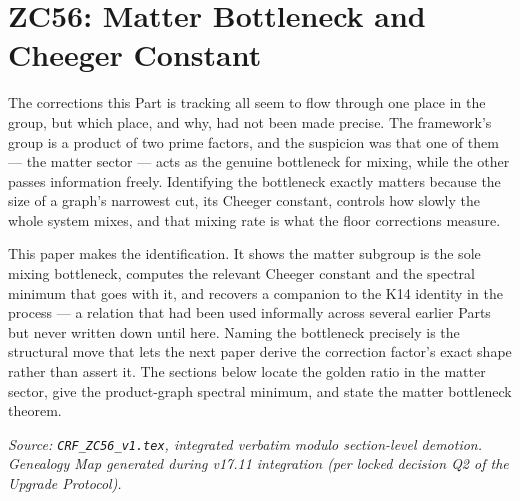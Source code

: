 \documentclass[12pt, a4paper]{article}
\begin{document}
\clearpage
\section{ZC56: Matter Bottleneck and Cheeger Constant}
\label{sec:zc56}

The corrections this Part is tracking all seem to flow through one place in the
group, but which place, and why, had not been made precise. The framework's
group is a product of two prime factors, and the suspicion was that one of them ---
the matter sector --- acts as the genuine bottleneck for mixing, while the other
passes information freely. Identifying the bottleneck exactly matters because the
size of a graph's narrowest cut, its Cheeger constant, controls how slowly the
whole system mixes, and that mixing rate is what the floor corrections measure.

This paper makes the identification. It shows the matter subgroup is the sole
mixing bottleneck, computes the relevant Cheeger constant and the spectral
minimum that goes with it, and recovers a companion to the K14 identity in the
process --- a relation that had been used informally across several earlier Parts
but never written down until here. Naming the bottleneck precisely is the
structural move that lets the next paper derive the correction factor's exact
shape rather than assert it. The sections below locate the golden ratio in the
matter sector, give the product-graph spectral minimum, and state the matter
bottleneck theorem.

\noindent
\textit{Source: \texttt{CRF\_ZC56\_v1.tex}, integrated verbatim modulo
section-level demotion. Genealogy Map generated during v17.11
integration (per locked decision Q2 of the Upgrade Protocol).}

\medskip
\end{document}
